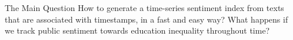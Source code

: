 \documentclass[final, notheorems]{beamer}
\newlength{\sepwid}
\newlength{\onecolwid}
\begin{document}
\begin{frame}[t]
\begin{columns}[t]
		\begin{column}{\sepwid}\end{column}			%
		\begin{column}{\onecolwid}
			\begin{alertblock}{The Main Question}
				How to generate a time-series sentiment index from texts that are
				associated with timestamps, in a fast and easy way?
				What happens if we track public sentiment towards education inequality
				throughout time?
			\end{alertblock}
		\end{column}

	\end{columns}
\end{frame}
\end{document}

